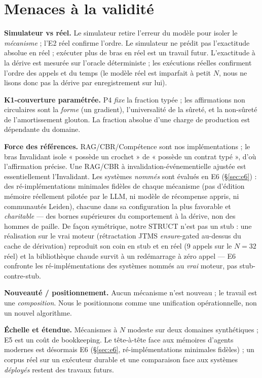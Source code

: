 \documentclass[11pt]{article}
\newcommand{\K}{\textsf{K1}}
\begin{document}
\section{Menaces à la validité}
\textbf{Simulateur vs réel.} Le simulateur retire l'erreur du modèle pour isoler le \emph{mécanisme} ; l'E2 réel
confirme l'ordre. Le simulateur ne prédit pas l'exactitude absolue en réel ; exécuter plus de bras en réel est un
travail futur. L'exactitude à la dérive est mesurée sur l'oracle déterministe ; les exécutions réelles confirment
l'ordre des appels et du temps (le modèle réel est imparfait à petit $N$, nous ne lisons donc pas la dérive par
enregistrement sur lui).

\textbf{\K{}-couverture paramétrée.} P4 \emph{fixe} la fraction typée ; les affirmations non circulaires sont la
\emph{forme} (un gradient), l'universalité de la sûreté, et la non-sûreté de l'amortissement glouton. La fraction
absolue d'une charge de production est dépendante du domaine.

\textbf{Force des références.} RAG/CBR/Compétence sont nos implémentations ; le bras Invalidant isole « possède un
crochet » de « possède un contrat typé », d'où l'affirmation précise. Une RAG/CBR à invalidation-événementielle
ajustée est essentiellement l'Invalidant. Les systèmes \emph{nommés} sont évalués en E6 (\S\ref{sec:e6}) : des
ré-implémentations minimales fidèles de chaque mécanisme (pas d'édition mémoire réellement pilotée par le LLM, ni
modèle de récompense appris, ni communautés Leiden), chacune dans sa configuration la plus favorable et
\emph{charitable} --- des bornes supérieures du comportement à la dérive, non des hommes de paille. De façon
symétrique, notre STRUCT n'est pas un stub : une réalisation sur le vrai moteur (rétractation JTMS \emph{ensure}-gated
au-dessus du cache de dérivation) reproduit son coin en stub et en réel (9 appels sur le $N=32$ réel) et la
bibliothèque chaude survit à un redémarrage à zéro appel --- E6 confronte les ré-implémentations des systèmes nommés
au \emph{vrai} moteur, pas stub-contre-stub.

\textbf{Nouveauté / positionnement.} Aucun mécanisme n'est nouveau ; le travail est une \emph{composition}. Nous le
positionnons comme une unification opérationnelle, non un nouvel algorithme.

\textbf{Échelle et étendue.} Mécanismes à $N$ modeste sur deux domaines synthétiques ; E5 est un coût de
bookkeeping. Le tête-à-tête face aux mémoires d'agents modernes est désormais E6 (\S\ref{sec:e6}, ré-implémentations
minimales fidèles) ; un corpus réel sur un exécuteur durable et une comparaison face aux systèmes \emph{déployés}
restent des travaux futurs.
\end{document}
